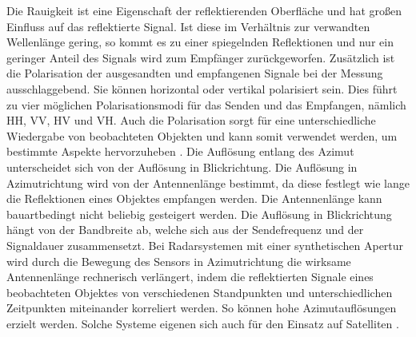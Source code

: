 Die Rauigkeit ist eine Eigenschaft der reflektierenden Oberfläche und hat großen Einfluss auf das reflektierte Signal. Ist diese im Verhältnis
zur verwandten Wellenlänge gering, so kommt es zu einer spiegelnden Reflektionen und nur ein geringer Anteil des Signals wird zum Empfänger zurückgeworfen. 
Zusätzlich ist die Polarisation der ausgesandten und empfangenen Signale bei der Messung ausschlaggebend. Sie können horizontal oder 
vertikal polarisiert sein. Dies führt zu vier möglichen Polarisationsmodi für das Senden und das Empfangen, 
nämlich HH, VV, HV und VH. Auch die 
Polarisation sorgt für eine unterschiedliche Wiedergabe von beobachteten Objekten und kann somit verwendet werden, um bestimmte Aspekte hervorzuheben
 \cite{einfuehrung_in_fernerkundung}. 
Die Auflösung entlang des Azimut unterscheidet sich von der Auflösung in Blickrichtung. 
Die Auflösung in Azimutrichtung wird von der Antennenlänge bestimmt, da diese festlegt wie lange die Reflektionen eines Objektes empfangen werden. 
Die Antennenlänge kann bauartbedingt nicht beliebig gesteigert werden.
Die Auflösung in Blickrichtung hängt von der Bandbreite ab, welche sich aus der Sendefrequenz und der Signaldauer zusammensetzt. 
Bei Radarsystemen mit einer synthetischen Apertur wird durch die Bewegung des Sensors in Azimutrichtung die 
wirksame Antennenlänge rechnerisch verlängert, indem die reflektierten Signale eines beobachteten Objektes von verschiedenen Standpunkten und unterschiedlichen Zeitpunkten 
miteinander korreliert werden. So können hohe Azimutauflösungen erzielt werden. Solche Systeme eigenen sich auch für den Einsatz auf Satelliten \cite{einfuehrung_in_fernerkundung}. 

